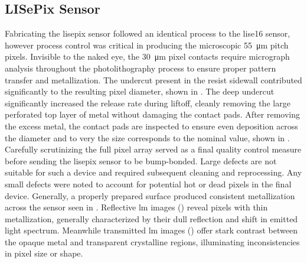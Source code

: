 \documentclass[../../../main.tex]{subfiles}
\begin{document}
%
    \subsection{LISePix Sensor}%
    \label{sec:chapter-3:advanced-imaging:timepix-sensor}%
    Fabricating the \gls{lisepix} sensor followed an identical process to the \gls{lise16} sensor, however process control was critical in producing the microscopic \SI{55}{\micro\meter} pitch pixels.
    Invisible to the naked eye, the \SI{30}{\micro\meter} pixel contacts require micrograph analysis throughout the photolithography process to ensure proper pattern transfer and metallization.
    The undercut present in the resist sidewall contributed significantly to the resulting pixel diameter, shown in .
    The deep undercut significantly increased the release rate during liftoff, cleanly removing the large perforated top layer of metal without damaging the contact pads.
    After removing the excess metal, the contact pads are inspected to ensure even deposition across the diameter and to very the size corresponds to the nominal value, shown in .
    Carefully scrutinizing the full pixel array served as a final quality control measure before sending the \gls{lisepix} sensor to be bump-bonded.
    Large defects are not suitable for such a device and required subsequent cleaning and reprocessing.
    Any small defects were noted to account for potential hot or dead pixels in the final device.
    Generally, a properly prepared surface produced consistent metallization across the sensor seen in .
    Reflective \gls{lm} images () reveal pixels with thin metallization, generally characterized by their dull reflection and shift in emitted light spectrum.
    Meanwhile transmitted \gls{lm} images () offer stark contrast between the opaque metal and transparent crystalline regions, illuminating inconsistencies in pixel size or shape.
\end{document}
